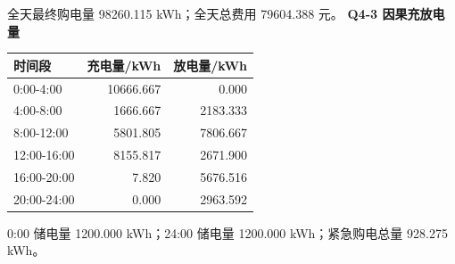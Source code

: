 全天最终购电量 98260.115 kWh；全天总费用 79604.388 元。
\textbf{Q4-3 因果充放电量}
\begin{longtable}[]{@{}lrr@{}}\toprule 时间段&充电量/kWh&放电量/kWh\\\midrule\endhead
0:00-4:00&10666.667&0.000\\4:00-8:00&1666.667&2183.333\\8:00-12:00&5801.805&7806.667\\12:00-16:00&8155.817&2671.900\\16:00-20:00&7.820&5676.516\\20:00-24:00&0.000&2963.592\\\bottomrule\end{longtable}
0:00 储电量 1200.000 kWh；24:00 储电量 1200.000 kWh；紧急购电总量 928.275 kWh。
